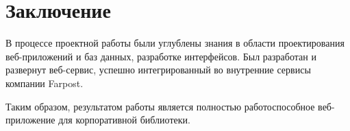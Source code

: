 \documentclass[../Отчет.tex]{subfiles}
\begin{document}
\section*{Заключение}
\par
В процессе проектной работы были углублены знания в области проектирования веб-приложений и баз данных, разработке интерфейсов. Был разработан и развернут веб-сервис, успешно интегрированный во внутренние сервисы компании Farpost.
\par
Таким образом, результатом работы является полностью работоспособное веб-приложение для корпоративной библиотеки.
\end{document}
